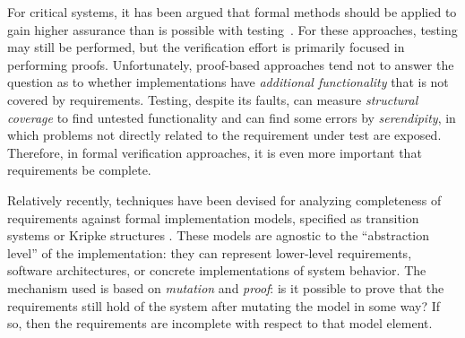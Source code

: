 

For critical systems, it has been argued that formal methods
should be applied to gain higher assurance than is possible with testing~\cite{ModelCheckingTakesOff,Miller,Rushby}.  For these approaches, testing may still be performed, but the verification effort is primarily focused in performing proofs.  Unfortunately, proof-based approaches tend not to answer the question as to whether implementations have {\em additional functionality} that is not covered by requirements.  Testing, despite its faults, can measure {\em structural coverage} to find untested functionality and can find some errors by {\em serendipity}, in which problems not directly related to the requirement under test are exposed.  Therefore, in formal verification approaches, it is even more important that requirements be complete.

Relatively recently, techniques have been devised for analyzing completeness of requirements against formal implementation models, specified as transition systems or Kripke structures \cite{chockler2001practical,das2005formal, claessen2007coverage, grosse2007estimating}.  These models are agnostic to the ``abstraction level'' of the implementation: they can represent lower-level requirements, software architectures, or concrete implementations of system behavior.  The mechanism used is based on {\em mutation} and {\em proof}: is it possible to prove that the requirements still hold of the system after mutating the model in some way?  If so, then the requirements are incomplete with respect to that model element.

